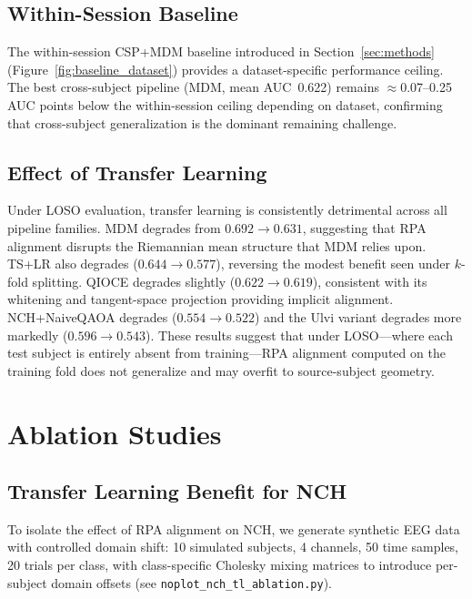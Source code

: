 \documentclass{article}
\begin{document}
\subsection{Within-Session Baseline}

The within-session CSP+MDM baseline introduced in
Section~\ref{sec:methods} (Figure~\ref{fig:baseline_dataset}) provides a
dataset-specific performance ceiling.  The best cross-subject pipeline
(MDM, mean AUC~0.622) remains $\approx$0.07--0.25 AUC points below the
within-session ceiling depending on dataset, confirming that cross-subject
generalization is the dominant remaining challenge.

\subsection{Effect of Transfer Learning}

Under LOSO evaluation, transfer learning is consistently detrimental across
all pipeline families.
MDM degrades from $0.692 \to 0.631$, suggesting that RPA alignment disrupts
the Riemannian mean structure that MDM relies upon.
TS+LR also degrades ($0.644 \to 0.577$), reversing the modest benefit
seen under $k$-fold splitting.  QIOCE degrades slightly ($0.622 \to 0.619$),
consistent with its whitening and tangent-space projection providing implicit
alignment.  NCH+NaiveQAOA degrades ($0.554 \to 0.522$) and the Ulvi variant
degrades more markedly ($0.596 \to 0.543$).
These results suggest that under LOSO---where each test subject is entirely
absent from training---RPA alignment computed on the training fold does not
generalize and may overfit to source-subject geometry.


\section{Ablation Studies}
\label{sec:ablation}

\subsection{Transfer Learning Benefit for NCH}
\label{sec:ablation_tl}

To isolate the effect of RPA alignment on NCH, we generate synthetic EEG data
with controlled domain shift: 10 simulated subjects, 4 channels, 50 time
samples, 20 trials per class, with class-specific Cholesky mixing matrices
to introduce per-subject domain offsets (see
\texttt{noplot\_nch\_tl\_ablation.py}).
\end{document}
